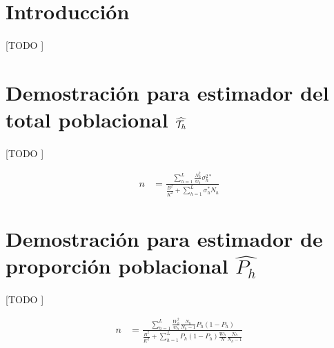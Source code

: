 \documentclass{article}
\begin{document}
  \maketitle


  \section{Introducción}

    \paragraph{}
    [TODO ]

  \section{Demostración para estimador del total poblacional $\widehat{\mathcal{T}_h}$}

    \paragraph{}
    [TODO ]

    \begin{align}
      n &=
        \frac{\sum\limits_{h=1}^{L} \frac{N_h^2}{w_h}\sigma_h^{2*}}
              {\frac{B^2}{K^2}+\sum\limits_{h=1}^{L}\sigma_h^* N_h}
    \end{align}

  \section{Demostración para estimador de proporción poblacional $\widehat{P_h}$}

    \paragraph{}
    [TODO ]

    \begin{align}
      n &=
        \frac{\sum\limits_{h=1}^L \frac{W_h^2}{w_h}\frac{N_h}{N_h-1}P_h(1-P_h)}
              {\frac{B^2}{K^2} + \sum\limits_{h=1}^LP_h(1-P_h)\frac{W_h}{N}\frac{N_h}{N_h-1}}
    \end{align}




  \nocite{muest2017}
  \nocite{sarndal2003model}

  
  
\end{document}
